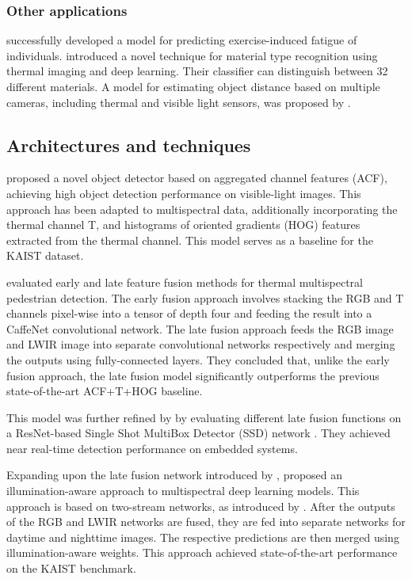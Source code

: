\documentclass{l4proj}
\begin{document}
\subsubsection{Other applications}

\citet{lopez_detecting_2017} successfully developed a model for predicting exercise-induced fatigue of individuals. \citet{cho_deep_2018} introduced a novel technique for material type recognition using thermal imaging and deep learning. Their classifier can distinguish between 32 different materials. A model for estimating object distance based on multiple cameras, including thermal and visible light sensors, was proposed by \citet{abdul_multi-disnet_2019}.

\subsection{Architectures and techniques}

\citet{dollar_fast_2014} proposed a novel object detector based on aggregated channel features (ACF), achieving high object detection performance on visible-light images. This approach has been adapted to multispectral data, additionally incorporating the thermal channel T, and histograms of oriented gradients (HOG) features \citep{dalal_histograms_2005} extracted from the thermal channel. This model serves as a baseline for the KAIST dataset.

\citet{wagner_multispectral_2016} evaluated early and late feature fusion methods for thermal multispectral pedestrian detection. The early fusion approach involves stacking the RGB and T channels pixel-wise into a tensor of depth four and feeding the result into a CaffeNet \citep{jia_caffe_2014} convolutional network. The late fusion approach feeds the RGB image and LWIR image into separate convolutional networks respectively and merging the outputs using fully-connected layers. They concluded that, unlike the early fusion approach, the late fusion model significantly outperforms the previous state-of-the-art ACF+T+HOG baseline. 

This model was further refined by \citet{osin_fast_2018} by evaluating different late fusion functions on a ResNet-based Single Shot MultiBox Detector (SSD) network \citep{liu_ssd_2016}. They achieved near real-time detection performance on embedded systems.

Expanding upon the late fusion network introduced by \citet{wagner_multispectral_2016}, \citet{guan_fusion_2019} proposed an illumination-aware approach to multispectral deep learning models. This approach is based on two-stream networks, as introduced by \citet{simonyan_two-stream_2014}. After the outputs of the RGB and LWIR networks are fused, they are fed into separate networks for daytime and nighttime images. The respective predictions are then merged using illumination-aware weights. This approach achieved state-of-the-art performance on the KAIST benchmark.
\end{document}
